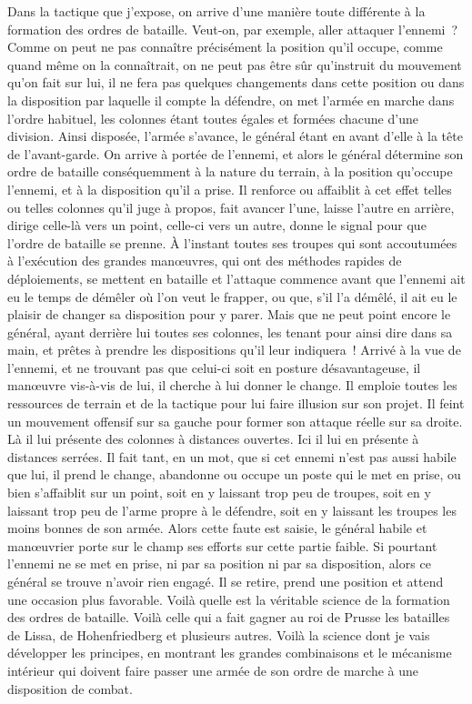 \documentclass[french,twoside]{book} %
\begin{document}
Dans la tactique que j’expose, on arrive d’une manière toute différente à la formation des ordres de bataille. Veut-on, par exemple, aller attaquer l’ennemi ? Comme on peut ne pas connaître précisément la position qu’il occupe, comme quand même on la connaîtrait, on ne peut pas être sûr qu’instruit du mouvement qu’on fait sur lui, il ne fera pas quelques changements dans cette position ou dans la disposition par laquelle il compte la défendre, on met l’armée en marche dans l’ordre habituel, les colonnes étant toutes égales et formées chacune d’une division. Ainsi disposée, l’armée s’avance, le général étant en avant d’elle à la tête de l’avant-garde. On arrive à portée de l’ennemi, et alors le général détermine son ordre de bataille conséquemment à la nature du terrain, à la position qu’occupe l’ennemi, et à la disposition qu’il a prise. Il renforce ou affaiblit à cet effet telles ou telles colonnes qu’il juge à propos, fait avancer l’une, laisse l’autre en arrière, dirige celle-là vers un point, celle-ci vers un autre, donne le signal pour que l’ordre de bataille se prenne. À l’instant toutes ses troupes qui sont accoutumées à l’exécution des grandes manœuvres, qui ont des méthodes rapides de déploiements, se mettent en bataille et l’attaque commence avant que l’ennemi ait eu le temps de démêler où l’on veut le frapper, ou que, s’il l’a démêlé, il ait eu le plaisir de changer sa disposition pour y parer. Mais que ne peut point encore le général, ayant derrière lui toutes ses colonnes, les tenant pour ainsi dire dans sa main, et prêtes à prendre les dispositions qu’il leur indiquera ! Arrivé à la vue de l’ennemi, et ne trouvant pas que celui-ci soit en posture désavantageuse, il manœuvre vis-à-vis de lui, il cherche à lui donner le change. Il emploie toutes les ressources de terrain et de la tactique pour lui faire illusion sur son projet. Il feint un mouvement offensif sur sa gauche pour former son attaque réelle sur sa droite. Là il lui présente des colonnes à distances ouvertes. Ici il lui en présente à distances serrées. Il fait tant, en un mot, que si cet ennemi n’est pas aussi habile que lui, il prend le change, abandonne ou occupe un poste qui le met en prise, ou bien s’affaiblit sur un point, soit en y laissant trop peu de troupes, soit en y laissant trop peu de l’arme propre à le défendre, soit en y laissant les troupes les moins bonnes de son armée. Alors cette faute est saisie, le général habile et manœuvrier porte sur le champ ses efforts sur cette partie faible. Si pourtant l’ennemi ne se met en prise, ni par sa position ni par sa disposition, alors ce général se trouve n’avoir rien engagé. Il se retire, prend une position et attend une occasion plus favorable. Voilà quelle est la véritable science de la formation des ordres de bataille. Voilà celle qui a fait gagner au roi de Prusse les batailles de Lissa, de Hohenfriedberg et plusieurs autres. Voilà la science dont je vais développer les principes, en montrant les grandes combinaisons et le mécanisme intérieur qui doivent faire passer une armée de son ordre de marche à une disposition de combat.\par
\end{document}
